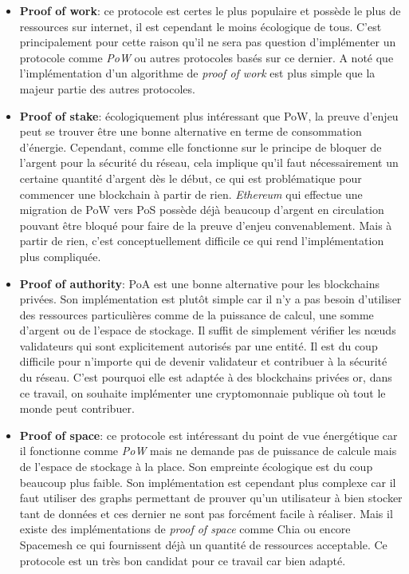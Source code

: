 \begin{itemize}
    \item \textbf{Proof of work}: ce protocole est certes le plus populaire et possède le plus de ressources sur internet, il est cependant le moins écologique de tous. C'est principalement pour cette raison qu'il ne sera pas question d'implémenter un protocole comme \textit{PoW} ou autres protocoles basés sur ce dernier. A noté que l'implémentation d'un algorithme de \textit{proof of work} est plus simple que la majeur partie des autres protocoles.
    \item \textbf{Proof of stake}: écologiquement plus intéressant que PoW, la preuve d'enjeu peut se trouver être une bonne alternative en terme de consommation d'énergie. Cependant, comme elle fonctionne sur le principe de bloquer de l'argent pour la sécurité du réseau, cela implique qu'il faut nécessairement un certaine quantité d'argent dès le début, ce qui est problématique pour commencer une blockchain à partir de rien. \textit{Ethereum} qui effectue une migration de PoW vers PoS possède déjà beaucoup d'argent en circulation pouvant être bloqué pour faire de la preuve d'enjeu convenablement. Mais à partir de rien, c'est conceptuellement difficile ce qui rend l'implémentation plus compliquée.
    \item \textbf{Proof of authority}: PoA est une bonne alternative pour les blockchains privées. Son implémentation est plutôt simple car il n'y a pas besoin d'utiliser des ressources particulières comme de la puissance de calcul, une somme d'argent ou de l'espace de stockage. Il suffit de simplement vérifier les nœuds validateurs qui sont explicitement autorisés par une entité. Il est du coup difficile pour n'importe qui de devenir validateur et contribuer à la sécurité du réseau. C'est pourquoi elle est adaptée à des blockchains privées or, dans ce travail, on souhaite implémenter une cryptomonnaie publique où tout le monde peut contribuer.
    \item \textbf{Proof of space}: ce protocole est intéressant du point de vue énergétique car il fonctionne comme \textit{PoW} mais ne demande pas de puissance de calcule mais de l'espace de stockage à la place. Son empreinte écologique est du coup beaucoup plus faible. Son implémentation est cependant plus complexe car il faut utiliser des graphs permettant de prouver qu'un utilisateur à bien stocker tant de données et ces dernier ne sont pas forcément facile à réaliser. Mais il existe des implémentations de \textit{proof of space} comme Chia ou encore Spacemesh ce qui fournissent déjà un quantité de ressources acceptable. Ce protocole est un très bon candidat pour ce travail car bien adapté.

\end{itemize}
